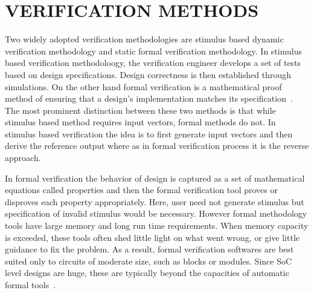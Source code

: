 \section{VERIFICATION METHODS}
Two widely adopted verification methodologies are stimulus based dynamic verification methodology and static formal verification methodology. In stimulus based verification methodoloogy, the verification engineer develops a set of tests based on design specifications. Design correctness is then established through simulations. On the other hand formal verification is a mathematical proof method of ensuring that a design's implementation matches its specification~\citep*{ieee:segev:2004}. The most prominent distinction between these two methods is that while stimulus based method requires input vectors, formal methods do not. In stimulus based verification the idea is to first generate input vectors and then derive the reference output where as in formal verification process it is the reverse approach.

In formal verification the behavior of design is captured as a set of mathematical equations called properties and then the formal verification tool proves or disproves each property appropriately. Here, user need not generate stimulus but specification of invalid stimulus would be necessary. However formal methodology tools have large memory and long run time requirements. When memory capacity is exceeded, these tools often shed little light on what went wrong, or give little guidance to fix the problem. As a result, formal verification softwares are best suited only to circuits of moderate size, such as blocks or modules. Since SoC level designs are huge, these are typically beyond the capacities of automatic formal tools~\citep*{ieee:formal:2004}. 

